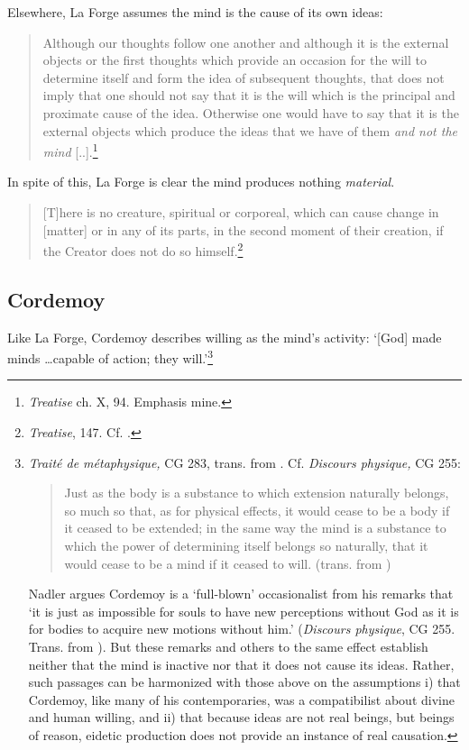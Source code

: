 Elsewhere, La Forge assumes the mind is the cause of its own ideas:

\begin{quote}
	Although our thoughts follow one another and although it is the external objects or the first thoughts which provide an occasion for the will to determine itself and form the idea of subsequent thoughts, that does not imply that one should not say that it is the will which is the principal and proximate cause of the idea. Otherwise one would have to say that it is the external objects which produce the ideas that we have of them \emph{and not the mind} {[}..{]}.\footnote{\emph{Treatise} ch. X, 94. Emphasis mine.}
\end{quote}

In spite of this, La Forge is clear the mind produces nothing \emph{material}.

\begin{quote}
	{[}T{]}here is no creature, spiritual or corporeal, which can cause change in {[}matter{]} or in any of its parts, in the second moment of their creation, if the Creator does not do so himself.\footnote{\emph{Treatise}, 147. Cf. \autocite{Klima1993}.}
\end{quote}

\subsection{Cordemoy}
Like La Forge, Cordemoy describes willing as the mind's activity: `{[}God{]} made minds \ldots capable of action; they will.'\footnote{\emph{Traité de métaphysique,} CG 283, trans. from \autocite[52]{Nadler2005}. Cf. \emph{Discours physique,} CG 255:
	
	\begin{quote}
		Just as the body is a substance to which extension naturally belongs, so much so that, as for physical effects, it would cease to be a body if it ceased to be extended; in the same way the mind is a substance to which the power of determining itself belongs so naturally, that it would cease to be a mind if it ceased to will. (trans. from \autocite[47]{Nadler2005})
	\end{quote}
	
	Nadler argues Cordemoy is a `full-blown' occasionalist from his remarks that `it is just as impossible for souls to have new perceptions without God as it is for bodies to acquire new motions without him.' (\emph{Discours physique}, CG 255. Trans. from \autocite[50]{Nadler2005}). But these remarks and others to the same effect establish neither that the mind is inactive nor that it does not cause its ideas. Rather, such passages can be harmonized with those above on the assumptions i) that Cordemoy, like many of his contemporaries, was a compatibilist about divine and human willing, and ii) that because ideas are not real beings, but beings of reason, eidetic production does not provide an instance of real causation.} 

